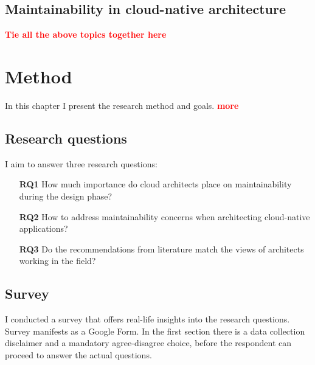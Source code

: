 \documentclass[utf8,english]{gradu3}
\newcommand{\todo}[1]{\textbf{\textcolor{red}{#1}}}
\begin{document}
\section{Maintainability in cloud-native architecture}
\todo{Tie all the above topics together here}

\chapter{Method}
\label{chapter:method}

In this chapter I present the research method and goals. \todo{more}

\section{Research questions}

I aim to answer three research questions:
\begin{itemize}
  \item [\textbf{RQ1}] How much importance do cloud architects place on maintainability during
        the design phase?
  \item [\textbf{RQ2}] How to address maintainability concerns when architecting cloud-native
        applications?
  \item [\textbf{RQ3}] Do the recommendations from literature match the views of architects
        working in the field?
\end{itemize}


\section{Survey}

I conducted a survey that offers real-life insights into the research questions.
Survey manifests as a Google Form.
In the first section there is a data collection disclaimer and a mandatory agree-disagree choice,
before the respondent can proceed to answer the actual questions.
\end{document}

